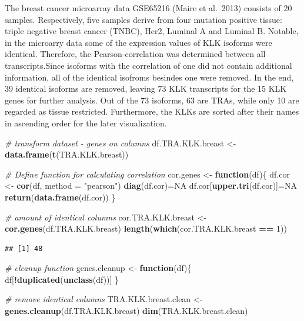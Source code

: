 \documentclass[
]{article}
\newenvironment{Shaded}{\begin{snugshade}}{\end{snugshade}}
\newcommand{\CommentTok}[1]{\textcolor[rgb]{0.56,0.35,0.01}{\textit{#1}}}
\newcommand{\ControlFlowTok}[1]{\textcolor[rgb]{0.13,0.29,0.53}{\textbf{#1}}}
\newcommand{\DataTypeTok}[1]{\textcolor[rgb]{0.13,0.29,0.53}{#1}}
\newcommand{\DecValTok}[1]{\textcolor[rgb]{0.00,0.00,0.81}{#1}}
\newcommand{\KeywordTok}[1]{\textcolor[rgb]{0.13,0.29,0.53}{\textbf{#1}}}
\newcommand{\NormalTok}[1]{#1}
\newcommand{\OperatorTok}[1]{\textcolor[rgb]{0.81,0.36,0.00}{\textbf{#1}}}
\newcommand{\OtherTok}[1]{\textcolor[rgb]{0.56,0.35,0.01}{#1}}
\newcommand{\StringTok}[1]{\textcolor[rgb]{0.31,0.60,0.02}{#1}}
\begin{document}
The breast cancer microarray data GSE65216 (Maire et al.~2013) consists
of 20 samples. Respectively, five samples derive from four mutation
positive tissue: triple negative breast cancer (TNBC), Her2, Luminal A
and Luminal B. Notable, in the microarry data some of the expression
values of KLK isoforms were identical. Therefore, the
Pearson-correlation was determined between all transcripts.Since
isoforms with the correlation of one did not contain additional
information, all of the identical isofroms besindes one were removed. In
the end, 39 identical isoforms are removed, leaving 73 KLK transcripts
for the 15 KLK genes for further analysis. Out of the 73 isoforms, 63
are TRAs, while only 10 are regarded as tissue restricted. Furthermore,
the KLKs are sorted after their names in ascending order for the later
visualization.

\begin{Shaded}
\begin{Highlighting}[]
\CommentTok{# transform dataset - genes on columns}
\NormalTok{df.TRA.KLK.breast <-}\StringTok{ }\KeywordTok{data.frame}\NormalTok{(}\KeywordTok{t}\NormalTok{(TRA.KLK.breast))}

\CommentTok{# Define function for calculating correlation }
\NormalTok{cor.genes <-}\StringTok{ }\ControlFlowTok{function}\NormalTok{(df)\{}
\NormalTok{  df.cor <-}\StringTok{ }\KeywordTok{cor}\NormalTok{(df, }\DataTypeTok{method =} \StringTok{"pearson"}\NormalTok{)}
  \KeywordTok{diag}\NormalTok{(df.cor)=}\OtherTok{NA}
\NormalTok{  df.cor[}\KeywordTok{upper.tri}\NormalTok{(df.cor)]=}\OtherTok{NA}
  \KeywordTok{return}\NormalTok{(}\KeywordTok{data.frame}\NormalTok{(df.cor))}
\NormalTok{\}}

\CommentTok{# amount of identical columns}
\NormalTok{cor.TRA.KLK.breast <-}\StringTok{ }\KeywordTok{cor.genes}\NormalTok{(df.TRA.KLK.breast)}
\KeywordTok{length}\NormalTok{(}\KeywordTok{which}\NormalTok{(cor.TRA.KLK.breast }\OperatorTok{==}\StringTok{ }\DecValTok{1}\NormalTok{))}
\end{Highlighting}
\end{Shaded}

\begin{verbatim}
## [1] 48
\end{verbatim}

\begin{Shaded}
\begin{Highlighting}[]
\CommentTok{# cleanup function }
\NormalTok{genes.cleanup <-}\StringTok{ }\ControlFlowTok{function}\NormalTok{(df)\{}
\NormalTok{  df[}\OperatorTok{!}\KeywordTok{duplicated}\NormalTok{(}\KeywordTok{unclass}\NormalTok{(df))]}
\NormalTok{\}}

\CommentTok{# remove identical columns}
\NormalTok{TRA.KLK.breast.clean <-}\StringTok{ }\KeywordTok{genes.cleanup}\NormalTok{(df.TRA.KLK.breast)}
\KeywordTok{dim}\NormalTok{(TRA.KLK.breast.clean)}
\end{Highlighting}
\end{Shaded}
\end{document}
